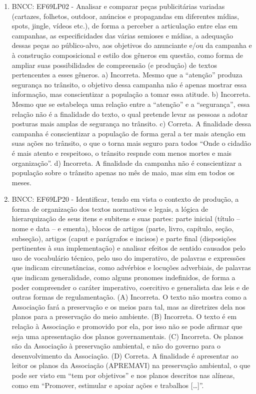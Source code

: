 \begin{enumerate}
\item
BNCC: EF69LP02 - Analisar e comparar peças publicitárias variadas (cartazes, folhetos, outdoor, anúncios e propagandas em diferentes mídias, spots, jingle, vídeos etc.), de forma a perceber a articulação entre elas em campanhas, as especificidades das várias semioses e mídias, a adequação dessas peças ao público-alvo, aos objetivos do anunciante e/ou da campanha e à construção composicional e estilo dos gêneros em questão, como forma de ampliar suas possibilidades de compreensão (e produção) de textos pertencentes a esses gêneros. a) Incorreta. Mesmo que a ``atenção'' produza segurança no trânsito, o objetivo dessa campanha não é apenas mostrar essa informação, mas conscientizar a população a tomar essa atitude. b) Incorreta. Mesmo que se estabeleça uma relação entre a ``atenção'' e a ``segurança'', essa relação não é a finalidade do texto, o qual pretende levar as pessoas a adotar posturas mais amplas de segurança no trânsito. c) Correta. A finalidade dessa campanha é conscientizar a população de forma geral a ter mais atenção em suas ações no trânsito, o que o torna mais seguro para todos ``Onde o cidadão é mais atento e respeitoso, o trânsito respnde com menos mortes e mais organização''. d) Incorreta. A finalidade da campanha não é conscientizar a população sobre o trânsito apenas no mês de maio, mas sim em todos os meses.

\item
BNCC: EF69LP20 - Identificar, tendo em vista o contexto de produção, a
forma de organização dos textos normativos e legais, a lógica de
hierarquização de seus itens e subitens e suas partes: parte inicial
(título -- nome e data -- e ementa), blocos de artigos (parte, livro,
capítulo, seção, subseção), artigos (caput e parágrafos e incisos) e
parte final (disposições pertinentes à sua implementação) e analisar
efeitos de sentido causados pelo uso de vocabulário técnico, pelo uso do
imperativo, de palavras e expressões que indicam circunstâncias, como
advérbios e locuções adverbiais, de palavras que indicam generalidade,
como alguns pronomes indefinidos, de forma a poder compreender o caráter
imperativo, coercitivo e generalista das leis e de outras formas de
regulamentação. (A) Incorreta. O texto não mostra como a Associação fará a preservação e os meios para tal, mas as diretrizes dela nos planos para a preservação do meio ambiente. (B) Incorreta. O texto é em relação à Associação e promovido por ela, por isso não se pode afirmar que seja uma apresentação dos planos governamentais. (C) Incorreta. Os planos são da Associação à preservação ambiental, e não do governo para o desenvolvimento da Associação. (D) Correta. A finalidade é apresentar ao leitor os planos da Associação (APREMAVI) na preservação ambiental, o que pode ser visto em ``tem por objetivos'' e nos planos descritos nas alíneas, como em ``Promover, estimular e apoiar ações e trabalhos {[}\ldots{}{]}''.


\end{enumerate}

